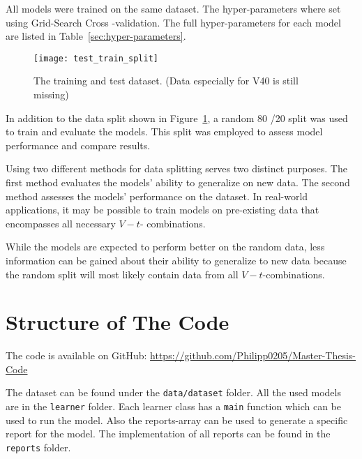 All models were trained on the same dataset. The hyper-parameters where set using Grid-Search Cross
-validation.
The full hyper-parameters for each model are listed in Table~\ref{sec:hyper-parameters}.

\begin{figure}[H]
    \begin{tcolorbox}[arc=0pt,boxrule=0.5pt]
        \centering
        \texttt{[image: test\_train\_split]}
        \caption{The training and test dataset. (Data especially for V40 is
        still missing)}
        \label{fig:train_test_split}
    \end{tcolorbox}
\end{figure}

In addition to the data split shown in Figure~\ref{fig:train_test_split}, a random 80
/20 split was used to train and evaluate the models.
This split was employed to assess model performance and compare results.

Using two different methods for data splitting serves two distinct purposes.
The first method evaluates the models' ability to generalize on new data.
The second method assesses the models' performance on the dataset.
In real-world applications, it may be possible to train models on pre-existing data
that encompasses all necessary $V-t$-
combinations.

While the models are expected to perform better on the random data, less information
can be gained about their ability to generalize to new data because the random split
will most likely contain data from all $V-t$-combinations.


\section{Structure of The Code}\label{sec:structure-of-the-code}
The code is available on GitHub: \url{https://github.com/Philipp0205/Master-Thesis-Code}

The dataset can be found under the \texttt{data/dataset} folder.
All the used models are in the \texttt{learner} folder. Each learner class has a
\texttt{main} function which can be used to run the model.
Also the reports-array can be used to generate a specific report for the model.
The implementation of all reports can be found in the \texttt{reports} folder.


